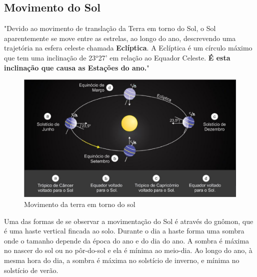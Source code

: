 \subsection{Movimento do Sol}

	"Devido ao movimento de translação da Terra em torno do Sol, o Sol aparentemente se move entre as estrelas, ao longo do ano, descrevendo uma trajetória na esfera celeste chamada \textbf{Eclíptica}. A Eclíptica é um círculo máximo que tem uma inclinação de 23$^o$27' em relação ao Equador Celeste. \textbf{É esta inclinação que causa as Estações do ano.}"\cite{Kepler}

\newpage

\begin{figure}[H]
  \begin{center}
	\includegraphics[keepaspectratio,scale=0.4,angle=0]{figuras/movimento.eps}
	\caption{Movimento da terra em torno do sol}
  \end{center}
\end{figure}

	Uma das formas de se observar a movimentação do Sol é através do gnômon, que é uma haste vertical fincada ao solo. Durante o dia a haste forma uma sombra onde o tamanho depende da época do ano e do dia do ano. A sombra é máxima no nascer do sol ou no pôr-do-sol e ela é mínima ao meio-dia. Ao longo do ano, à mesma hora do dia, a sombra é máxima no solstício de inverno, e mínima no solstício de verão.

